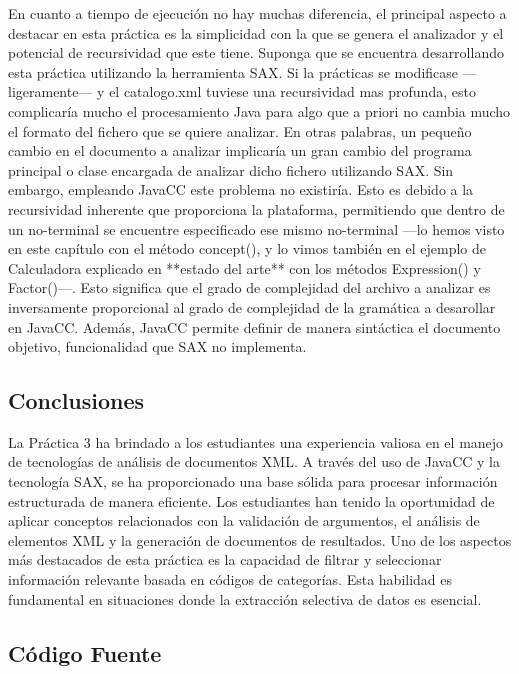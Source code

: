 En cuanto a tiempo de ejecución no hay muchas diferencia, el principal aspecto a destacar en esta práctica es la simplicidad con la que se genera el analizador y el potencial de recursividad que este tiene. 
Suponga que se encuentra desarrollando esta práctica utilizando la herramienta SAX. Si la prácticas se modificase ---ligeramente--- y el catalogo.xml tuviese una recursividad mas profunda, esto complicaría mucho el procesamiento Java para algo que a priori no cambia mucho el formato del fichero que se quiere analizar. En otras palabras, un pequeño cambio en el documento a analizar implicaría un gran cambio del programa principal o clase encargada de analizar dicho fichero utilizando SAX.
Sin embargo, empleando JavaCC este problema no existiría. Esto es debido a la recursividad inherente que proporciona la plataforma, permitiendo que dentro de un no-terminal se encuentre especificado ese mismo no-terminal ---lo hemos visto en este capítulo con el método concept(), y lo vimos también en el ejemplo de Calculadora explicado en **estado del arte** con los métodos Expression() y Factor()---. Esto significa que el grado de complejidad del archivo a analizar es inversamente proporcional al grado de complejidad de la gramática a desarollar en JavaCC.
Además, JavaCC permite definir de manera sintáctica el documento objetivo, funcionalidad que SAX no implementa.

\subsection{Conclusiones}

\noindent La Práctica 3 ha brindado a los estudiantes una experiencia valiosa en el manejo de tecnologías de análisis de documentos XML. A través del uso de JavaCC y la tecnología SAX, se ha proporcionado una base sólida para procesar información estructurada de manera eficiente. Los estudiantes han tenido la oportunidad de aplicar conceptos relacionados con la validación de argumentos, el análisis de elementos XML y la generación de documentos de resultados.
Uno de los aspectos más destacados de esta práctica es la capacidad de filtrar y seleccionar información relevante basada en códigos de categorías. Esta habilidad es fundamental en situaciones donde la extracción selectiva de datos es esencial.


\subsection{Código Fuente}

